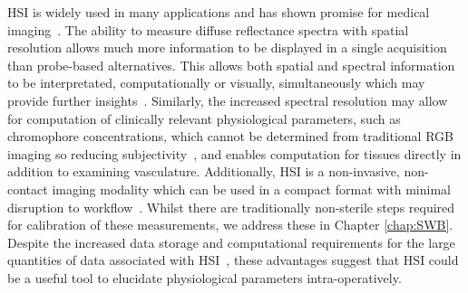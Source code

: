 HSI is widely used in many applications and has shown promise for medical imaging~\cite{Lu2014,Giannoni2018,Calin2014,Shapey2019}. The ability to measure diffuse reflectance spectra with spatial resolution allows much more information to be displayed in a single acquisition than probe-based alternatives. This allows both spatial and spectral information to be interpretated, computationally or visually, simultaneously which may provide further insights~\cite{Seidlitz2022}. Similarly, the increased spectral resolution may allow for computation of clinically relevant physiological parameters, such as chromophore concentrations, which cannot be determined from traditional RGB imaging so reducing subjectivity~\cite{Seidlitz2022}, and enables computation for tissues directly in addition to examining vasculature. Additionally, HSI is a non-invasive, non-contact imaging modality which can be used in a compact format with minimal disruption to workflow~\cite{Thoenissen2023, Ebner2021, MacCormac2023}. Whilst there are traditionally non-sterile steps required for calibration of these measurements, we address these in Chapter \ref{chap:SWB}. Despite the increased data storage and computational requirements for the large quantities of data associated with HSI~\cite{Altamimi2022}, these advantages suggest that HSI could be a useful tool to elucidate physiological parameters intra-operatively. 

